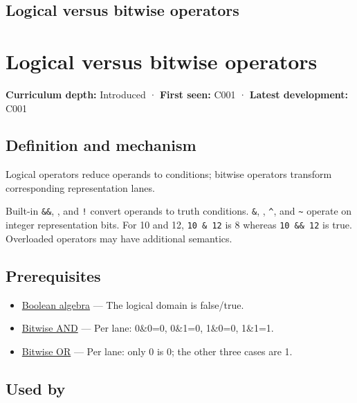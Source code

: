 \hypertarget{appendix-fe6b457d68d8}{}
\section*{Logical versus bitwise operators}
\chapter{Logical versus bitwise operators}\label{appendix-fe6b457d68d8-logical-versus-bitwise-operators}

\textbf{Curriculum depth:} Introduced · \textbf{First seen:} C001 · \textbf{Latest development:} C001

\section{Definition and mechanism}\label{appendix-fe6b457d68d8-definition-and-mechanism}

Logical operators reduce operands to conditions; bitwise operators transform corresponding representation lanes.

Built-in \texttt{\&\&}, \texttt{\textbar{}\textbar{}}, and \texttt{!} convert operands to truth conditions. \texttt{\&}, \texttt{\textbar{}}, \texttt{\^{}}, and \texttt{\textasciitilde{}} operate on integer representation bits. For 10 and 12, \texttt{10\ \&\ 12} is 8 whereas \texttt{10\ \&\&\ 12} is true. Overloaded operators may have additional semantics.

\section{Prerequisites}\label{appendix-fe6b457d68d8-prerequisites}

\begin{itemize}
\tightlist
\item
  \hyperref[appendix-24475e1596a8]{Boolean algebra} --- The logical domain is false/true.
\item
  \hyperref[appendix-68b52453737c]{Bitwise AND} --- Per lane: 0\&0=0, 0\&1=0, 1\&0=0, 1\&1=1.
\item
  \hyperref[appendix-a427ce8ce8a6]{Bitwise OR} --- Per lane: only 0 is 0; the other three cases are 1.
\end{itemize}

\section{Used by}\label{appendix-fe6b457d68d8-used-by}

